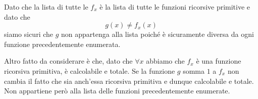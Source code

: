Dato che la lista di tutte le $f_x$ è la lista di tutte le
funzioni ricorsive primitive e dato che
\[ g(x) \neq f_x (x) \]
siamo sicuri che $g$ non appartenga alla lista poiché è
sicuramente diversa da ogni funzione precedentemente enumerata.

Altro fatto da considerare è che, dato che $\forall x$ abbiamo
che $f_x$ è una funzione ricorsiva primitiva, è calcolabile e
totale. Se la funzione $g$ somma $1$ a $f_x$ non cambia il fatto
che sia anch'essa ricorsiva primitiva e dunque calcolabile e
totale. Non appartiene però alla lista delle funzioni
precedentemente enumerate.
